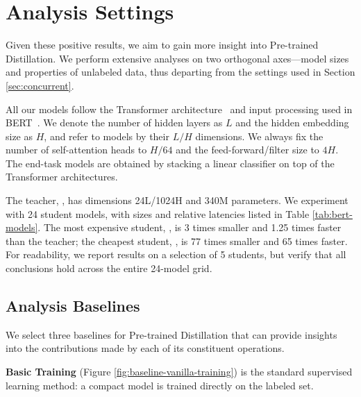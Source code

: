 \section{Analysis Settings}
\label{sec:experimental-set-up}


Given these positive results, we aim to gain more insight into Pre-trained Distillation. We perform extensive analyses on two orthogonal axes---model sizes and properties of unlabeled data, thus departing from the settings used in Section \ref{sec:concurrent}.

All our models follow the Transformer  architecture~\citep{transformer} and input processing used in BERT~\cite{bert}. We denote the number of hidden layers as $L$ and the hidden embedding size as $H$, and refer to models by their $L/H$ dimensions. We always fix the number of self-attention heads to $H / 64$ and the feed-forward/filter size to $4H$. The end-task models are obtained by stacking a linear classifier on top of the Transformer architectures.

The teacher, \bertlarge, has dimensions 24L/1024H and 340M parameters. We experiment with 24 student models, with sizes and relative latencies listed in Table \ref{tab:bert-models}. The most expensive student, \bertbase, is 3 times smaller and 1.25 times faster than the teacher; the cheapest student, \bertsmall, is 77 times smaller and 65 times faster. For readability, we report results on a selection of 5 students, but verify that all conclusions hold across the entire 24-model grid.

\subsection{Analysis Baselines}

\label{sec:baselines}
We select three baselines for Pre-trained Distillation that can provide insights into the contributions made by each of its constituent operations. 

\textbf{Basic Training} (Figure \ref{fig:baseline-vanilla-training}) is the standard  supervised learning method: a compact model is trained directly on the labeled set.

